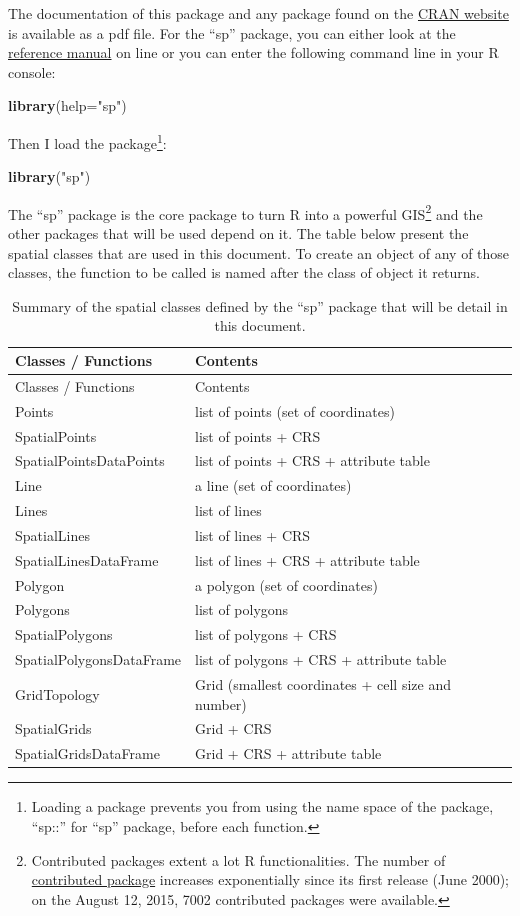 \documentclass[]{report}
\newenvironment{Shaded}{\begin{snugshade}}{\end{snugshade}}
\newcommand{\KeywordTok}[1]{\textcolor[rgb]{0.13,0.29,0.53}{\textbf{{#1}}}}
\newcommand{\DataTypeTok}[1]{\textcolor[rgb]{0.13,0.29,0.53}{{#1}}}
\newcommand{\StringTok}[1]{\textcolor[rgb]{0.31,0.60,0.02}{{#1}}}
\newcommand{\NormalTok}[1]{{#1}}
\let\rmarkdownfootnote\footnote%
\def\footnote{\protect\rmarkdownfootnote}
\begin{document}
The documentation of this package and any package found on the
\href{http://cran.r-project.org/doc/manuals/r-release/R-intro.html}{CRAN
website} is available as a pdf file. For the ``sp'' package, you can
either look at the
\href{http://cran.r-project.org/web/packages/sp/index.html}{reference
manual} on line or you can enter the following command line in your R
console:

\begin{Shaded}
\begin{Highlighting}[]
\KeywordTok{library}\NormalTok{(}\DataTypeTok{help=}\StringTok{"sp"}\NormalTok{)}
\end{Highlighting}
\end{Shaded}

Then I load the package\footnote{Loading a package prevents you from
  using the name space of the package, ``sp::'' for ``sp'' package,
  before each function.}:

\begin{Shaded}
\begin{Highlighting}[]
\KeywordTok{library}\NormalTok{(}\StringTok{"sp"}\NormalTok{)}
\end{Highlighting}
\end{Shaded}

The ``sp'' package is the core package to turn R into a powerful
GIS\footnote{Contributed packages extent a lot R functionalities. The
  number of \href{https://cran.r-project.org/web/packages/}{contributed
  package} increases exponentially since its first release (June 2000);
  on the August 12, 2015, 7002 contributed packages were available.} and
the other packages that will be used depend on it. The table below
present the spatial classes that are used in this document. To create an
object of any of those classes, the function to be called is named after
the class of object it returns.

\begin{longtable}[]{@{}ll@{}}
\caption{Summary of the spatial classes defined by the ``sp'' package
that will be detail in this document.}\tabularnewline
\toprule
Classes / Functions & Contents\tabularnewline
\midrule
\endfirsthead
\toprule
Classes / Functions & Contents\tabularnewline
\midrule
\endhead
Points & list of points (set of coordinates)\tabularnewline
SpatialPoints & list of points + CRS\tabularnewline
SpatialPointsDataPoints & list of points + CRS + attribute
table\tabularnewline
Line & a line (set of coordinates)\tabularnewline
Lines & list of lines\tabularnewline
SpatialLines & list of lines + CRS\tabularnewline
SpatialLinesDataFrame & list of lines + CRS + attribute
table\tabularnewline
Polygon & a polygon (set of coordinates)\tabularnewline
Polygons & list of polygons\tabularnewline
SpatialPolygons & list of polygons + CRS\tabularnewline
SpatialPolygonsDataFrame & list of polygons + CRS + attribute
table\tabularnewline
GridTopology & Grid (smallest coordinates + cell size and
number)\tabularnewline
SpatialGrids & Grid + CRS\tabularnewline
SpatialGridsDataFrame & Grid + CRS + attribute table\tabularnewline
\bottomrule
\end{longtable}
\end{document}
